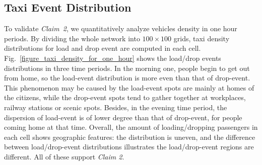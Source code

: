 \subsection{Taxi Event Distribution}
\label{section_taxi_denstiy_distribution}

To validate \emph{Claim~2}, we quantitatively analyze vehicles density in one hour periods. By dividing the whole network into $100 \times 100$ grids, taxi density distributions for load and drop event are computed in each cell. Fig.~\ref{figure_taxi_density_for_one_hour} shows the load/drop events distributions in three time periods. In the morning one, people begin to get out from home, so the load-event distribution is more even than that of drop-event. This phenomenon may be caused by the load-event spots are mainly at homes of the citizens, while the drop-event spots tend to gather together at workplaces, railway stations or scenic spots. Besides, in the evening time period, the dispersion of load-event is of lower degree than that of drop-event, for people coming home at that time. Overall, the amount of loading/dropping passengers in each cell shows geographic features: the distribution is uneven, and the difference between load/drop-event distributions illustrates the load/drop-event regions are different. All of these support \emph{Claim 2}.




